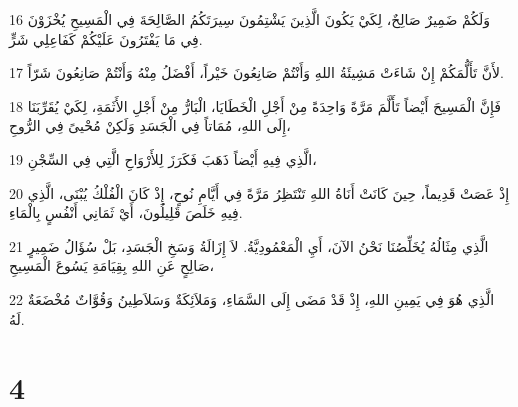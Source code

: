 \par 16 وَلَكُمْ ضَمِيرٌ صَالِحٌ، لِكَيْ يَكُونَ الَّذِينَ يَشْتِمُونَ سِيرَتَكُمُ الصَّالِحَةَ فِي الْمَسِيحِ يُخْزَوْنَ فِي مَا يَفْتَرُونَ عَلَيْكُمْ كَفَاعِلِي شَرٍّ.
\par 17 لأَنَّ تَأَلُّمَكُمْ إِنْ شَاءَتْ مَشِيئَةُ اللهِ وَأَنْتُمْ صَانِعُونَ خَيْراً، أَفْضَلُ مِنْهُ وَأَنْتُمْ صَانِعُونَ شَرّاً.
\par 18 فَإِنَّ الْمَسِيحَ أَيْضاً تَأَلَّمَ مَرَّةً وَاحِدَةً مِنْ أَجْلِ الْخَطَايَا، الْبَارُّ مِنْ أَجْلِ الأَثَمَةِ، لِكَيْ يُقَرِّبَنَا إِلَى اللهِ، مُمَاتاً فِي الْجَسَدِ وَلَكِنْ مُحْيىً فِي الرُّوحِ،
\par 19 الَّذِي فِيهِ أَيْضاً ذَهَبَ فَكَرَزَ لِلأَرْوَاحِ الَّتِي فِي السِّجْنِ،
\par 20 إِذْ عَصَتْ قَدِيماً، حِينَ كَانَتْ أَنَاةُ اللهِ تَنْتَظِرُ مَرَّةً فِي أَيَّامِ نُوحٍ، إِذْ كَانَ الْفُلْكُ يُبْنَى، الَّذِي فِيهِ خَلَصَ قَلِيلُونَ، أَيْ ثَمَانِي أَنْفُسٍ بِالْمَاءِ.
\par 21 الَّذِي مِثَالُهُ يُخَلِّصُنَا نَحْنُ الآنَ، أَيِ الْمَعْمُودِيَّةُ. لاَ إِزَالَةُ وَسَخِ الْجَسَدِ، بَلْ سُؤَالُ ضَمِيرٍ صَالِحٍ عَنِ اللهِ بِقِيَامَةِ يَسُوعَ الْمَسِيحِ،
\par 22 الَّذِي هُوَ فِي يَمِينِ اللهِ، إِذْ قَدْ مَضَى إِلَى السَّمَاءِ، وَمَلاَئِكَةٌ وَسَلاَطِينُ وَقُوَّاتٌ مُخْضَعَةٌ لَهُ.

\chapter{4}

